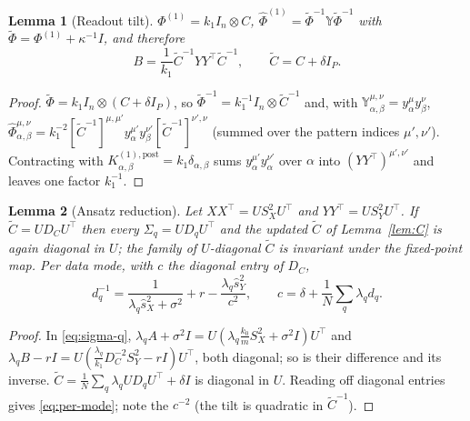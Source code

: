 \documentclass[11pt,a4paper]{article}
\newcommand{\sX}{\hat s_X^2}
\newcommand{\sY}{\hat s_Y^2}
\newtheorem{lemma}{Lemma}
\theoremstyle{remark}
\begin{document}
\begin{lemma}[Readout tilt]\label{lem:B}
$\Phi^{(1)} = k_1 I_n\otimes C$, $\hat\Phi^{(1)} = \tilde\Phi^{-1}\mathbb Y\tilde\Phi^{-1}$ with $\tilde\Phi = \Phi^{(1)} + \kappa^{-1}I$, and therefore
\begin{equation}
  B = \frac1{k_1}\tilde C^{-1}YY^\top\tilde C^{-1}, \qquad \tilde C = C + \delta I_P .
\end{equation}
\end{lemma}
\begin{proof}
$\tilde\Phi = k_1 I_n\otimes(C + \delta I_P)$, so $\tilde\Phi^{-1} = k_1^{-1}I_n\otimes\tilde C^{-1}$ and, with $\mathbb Y^{\mu,\nu}_{\alpha,\beta} = y^\mu_\alpha y^\nu_\beta$, $\hat\Phi^{\mu,\nu}_{\alpha,\beta} = k_1^{-2}[\tilde C^{-1}]^{\mu,\mu'}y^{\mu'}_\alpha y^{\nu'}_\beta[\tilde C^{-1}]^{\nu',\nu}$ (summed over the pattern indices $\mu',\nu'$). Contracting with $K^{(1),\mathrm{post}}_{\alpha,\beta} = k_1\delta_{\alpha,\beta}$ sums $y^{\mu'}_\alpha y^{\nu'}_\alpha$ over $\alpha$ into $(YY^\top)^{\mu',\nu'}$ and leaves one factor $k_1^{-1}$.
\end{proof}

\begin{lemma}[Ansatz reduction]\label{lem:ansatz}
Let $XX^\top = US_X^2U^\top$ and $YY^\top = US_Y^2U^\top$. If $\tilde C = UD_CU^\top$ then every $\Sigma_q = UD_qU^\top$ and the updated $\tilde C$ of Lemma~\ref{lem:C} is again diagonal in $U$; the family of $U$-diagonal $\tilde C$ is invariant under the fixed-point map. Per data mode, with $c$ the diagonal entry of $D_C$,
\begin{equation}
  d_q^{-1} = \frac{1}{\lambda_q\sX + \sigma^2} + r - \frac{\lambda_q\sY}{c^2},
  \qquad
  c = \delta + \frac1N\sum_q\lambda_q d_q .
  \label{eq:per-mode}
\end{equation}
\end{lemma}
\begin{proof}
In \eqref{eq:sigma-q}, $\lambda_qA + \sigma^2 I = U(\lambda_q\frac{k_0}{m}S_X^2 + \sigma^2I)U^\top$ and $\lambda_qB - rI = U(\frac{\lambda_q}{k_1}D_C^{-2}S_Y^2 - r I)U^\top$, both diagonal; so is their difference and its inverse. $\tilde C = \frac1N\sum_q\lambda_q UD_qU^\top + \delta I$ is diagonal in $U$. Reading off diagonal entries gives \eqref{eq:per-mode}; note the $c^{-2}$ (the tilt is quadratic in $\tilde C^{-1}$).
\end{proof}
\end{document}
